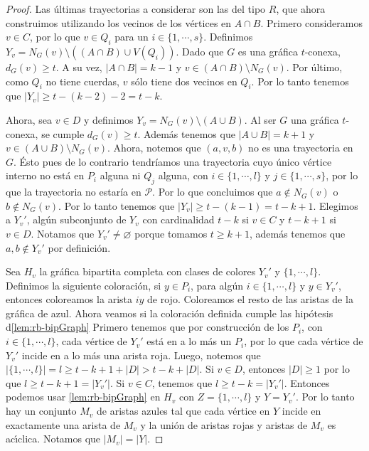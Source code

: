 \begin{proof}
    Las \'ultimas trayectorias a considerar son las del tipo $R$, que ahora
    construimos utilizando los vecinos de los v\'ertices en $A \cap B$. Primero
    consideramos $v \in C$, por lo que $v \in Q_i$ para un  $i \in \{1, \cdots,
    s\}$. Definimos $Y_v = N_G(v) \setminus ((A \cap B) \cup V(Q_i))$. Dado que
    $G$ es una gr\'afica $t$-conexa, $d_G(v) \geq t$. A su vez, $|A \cap B| =k
    -1$ y $v \in (A \cap B) \setminus N_G(v)$. Por \'ultimo, como $Q_i$ no tiene
    cuerdas, $v$ s\'olo tiene dos vecinos en $Q_i$. Por lo tanto tenemos que
    $|Y_v| \geq t- (k-2)-2 = t-k$. 
    
    Ahora, sea $v \in D$ y definimos $Y_v = N_G(v) \setminus (A \cup B)$. Al ser
    $G$ una gr\'afica $t$-conexa, se cumple $d_G(v) \geq t$. Adem\'as tenemos
    que $|A \cup B| = k + 1$ y $v \in (A \cup B) \setminus N_G(v)$. Ahora,
    notemos que $(a, v, b)$ no es una trayectoria en $G$. \'Esto pues de lo
    contrario tendr\'iamos una trayectoria cuyo \'unico v\'ertice interno no
    est\'a en $P_i$ alguna ni $Q_j$ alguna, con $i \in \{1, \cdots, l\}$ y $j \in
    \{1, \cdots, s\}$, por lo que la trayectoria no estar\'ia en $\mathcal{P}$.
    Por lo que concluimos que $a \notin N_G(v)$ o $b \notin N_G(v)$. Por lo
    tanto tenemos que $|Y_v| \geq t- (k-1) = t-k + 1$. Elegimos a $Y_v '$,
    alg\'un subconjunto de $Y_v$ con cardinalidad $t-k$ si $v \in C$ y $t- k+ 1$
    si $v \in D$. Notamos que $Y_v ' \neq \varnothing$ porque tomamos $t \geq k
    + 1$, adem\'as tenemos que $a, b \notin Y_v '$ por definici\'on. 

    Sea $H_v$ la gr\'afica bipartita completa con clases de colores $Y_v '$ y
    $\{1,\cdots, l\}$. Definimos la siguiente coloraci\'on, si $y \in P_i$, para
    alg\'un $i \in \{1, \cdots, l\}$ y $y \in Y_v '$, entonces coloreamos la
    arista $iy$ de rojo. Coloreamos el resto de las aristas de la gr\'afica de
    azul. Ahora veamos si la coloraci\'on definida cumple las hip\'otesis
    d\cref{lem:rb-bipGraph} Primero tenemos que por construcci\'on
    de los $P_i$, con $i \in \{1, \cdots, l\}$, cada v\'ertice de $Y_v '$ est\'a
    en a lo m\'as un $P_i$, por lo que cada v\'ertice de $Y_v '$ incide en a lo
    m\'as una arista roja. Luego, notemos que $|\{1, \cdots, l\}| = l  \geq t-k+
    1+ |D| > t-k + |D|$. Si $v \in D$, entonces $|D| \geq 1$ por lo que $l \geq
    t- k+1 = |Y_v '|$. Si $v \in C$, tenemos que $l \geq t-k = |Y_v '|$.
    Entonces podemos usar \cref{lem:rb-bipGraph} en $H_v$ con $Z=
    \{1, \cdots, l\}$ y $Y = Y_v '$. Por lo tanto hay un conjunto $M_v$ de
    aristas azules tal que cada v\'ertice en $Y$ incide en exactamente una
    arista de $M_v$ y la uni\'on de aristas rojas y aristas de $M_v$ es
    ac\'\i{}clica. Notamos que $|M_v|=|Y|$.


\end{proof}

